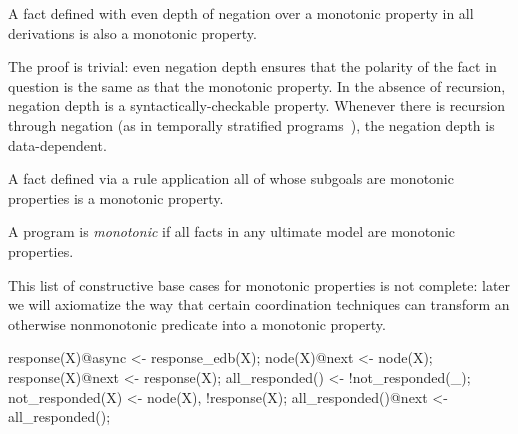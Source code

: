 \begin{definition}
A fact defined with even depth of negation over a monotonic property in all derivations is also a monotonic property. 
\end{definition}

The proof is trivial: even negation depth ensures that the polarity of the fact in question is the
same as that the monotonic property.  In the absence of recursion, negation depth is a syntactically-checkable property.  Whenever there is recursion through negation
(as in temporally stratified \lang programs~\cite{dedalus}), the negation depth is data-dependent.

\begin{definition}
A fact defined via a rule application all of whose subgoals are monotonic properties is a
monotonic property.  
\end{definition}

\begin{definition}
A \lang program is {\em monotonic} if all facts in any ultimate model are monotonic properties.
\end{definition}

This list of constructive base cases for monotonic properties is not complete: later we will
axiomatize the way that certain coordination techniques can transform an otherwise 
nonmonotonic predicate into a monotonic property.

\begin{example}
\begin{Dedalus}
response(X)@async <- response_edb(X);
node(X)@next <- node(X);
response(X)@next <- response(X);
all_responded() <- !not_responded(_);
not_responded(X) <- node(X), !response(X);
all_responded()@next <- all_responded();
\end{Dedalus}
\end{example}

